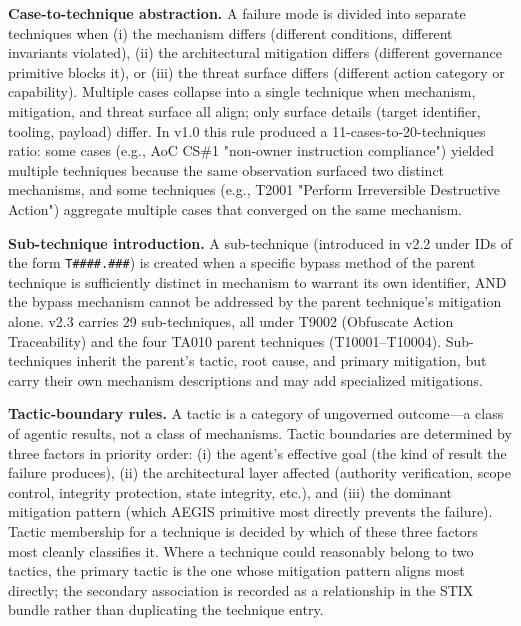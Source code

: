 \documentclass{IEEEoj-data}
\newcommand{\added}[1]{#1}
\begin{document}
\added{{\bf Case-to-technique abstraction.} A failure mode is divided into separate techniques when (i) the mechanism differs (different conditions, different invariants violated), (ii) the architectural mitigation differs (different governance primitive blocks it), or (iii) the threat surface differs (different action category or capability). Multiple cases collapse into a single technique when mechanism, mitigation, and threat surface all align; only surface details (target identifier, tooling, payload) differ. In v1.0 this rule produced a 11-cases-to-20-techniques ratio: some cases (e.g., AoC CS\#1 "non-owner instruction compliance") yielded multiple techniques because the same observation surfaced two distinct mechanisms, and some techniques (e.g., T2001 "Perform Irreversible Destructive Action") aggregate multiple cases that converged on the same mechanism.}

\added{{\bf Sub-technique introduction.} A sub-technique (introduced in v2.2 under IDs of the form \texttt{T\#\#\#\#.\#\#\#}) is created when a specific bypass method of the parent technique is sufficiently distinct in mechanism to warrant its own identifier, AND the bypass mechanism cannot be addressed by the parent technique's mitigation alone. v2.3 carries 29 sub-techniques, all under T9002 (Obfuscate Action Traceability) and the four TA010 parent techniques (T10001--T10004). Sub-techniques inherit the parent's tactic, root cause, and primary mitigation, but carry their own mechanism descriptions and may add specialized mitigations.}

\added{{\bf Tactic-boundary rules.} A tactic is a category of ungoverned outcome---a class of agentic results, not a class of mechanisms. Tactic boundaries are determined by three factors in priority order: (i) the agent's effective goal (the kind of result the failure produces), (ii) the architectural layer affected (authority verification, scope control, integrity protection, state integrity, etc.), and (iii) the dominant mitigation pattern (which AEGIS primitive most directly prevents the failure). Tactic membership for a technique is decided by which of these three factors most cleanly classifies it. Where a technique could reasonably belong to two tactics, the primary tactic is the one whose mitigation pattern aligns most directly; the secondary association is recorded as a relationship in the STIX bundle rather than duplicating the technique entry.}
\end{document}
